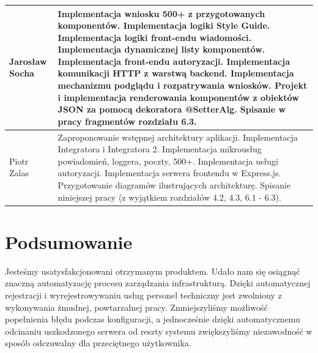 \documentclass[licencjacka]{pracamgr}
\begin{document}
\begin{tabularx}{\linewidth}{|l|X|}
	\hline
	Jarosław Socha & Implementacja wniosku 500+ z przygotowanych komponentów. \newline
		Implementacja logiki Style Guide. \newline
		Implementacja logiki front-endu wiadomości. \newline
		Implementacja dynamicznej listy komponentów. \newline
 		Implementacja front-endu autoryzacji. \newline
 		Implementacja komunikacji HTTP z warstwą backend. \newline
		Implementacja mechanizmu podglądu i rozpatrywania wniosków. \newline
		Projekt i implementacja renderowania komponentów z obiektów JSON za pomocą dekoratora @SetterAlg. \newline
		Spisanie w pracy fragmentów rozdziału 6.3.
	\\
	\hline 
	Piotr Zalas & Zaproponowanie wstępnej architektury aplikacji.\newline
	  Implementacja Integratora i Integratora 2.\newline
	  Implementacja mikrousług powiadomień, loggera, poczty, 500+.\newline
	  Implementacja usługi autoryzacji.\newline
	  Implementacja serwera frontendu w Express.js.\newline
	  Przygotowanie diagramów ilustrujących architekturę.\newline
	  Spisanie niniejszej pracy (z wyjątkiem rozdziałów 4.2, 4.3, 6.1 - 6.3).\\
	\hline
\end{tabularx}

\chapter{Podsumowanie}

Jesteśmy usatysfakcjonowani otrzymanym produktem. Udało nam się osiągnąć znaczną
automatyzację procesu zarządzania infrastrukturą. Dzięki automatycznej rejestracji i
wyrejestrowywaniu usług personel techniczny jest zwolniony z wykonywania żmudnej,
powtarzalnej pracy. Zmniejszyliśmy możliwość popełnienia błędu podczas konfiguracji,
a jednocześnie dzięki automatycznemu odcinaniu uszkodzonego serwera od reszty systemu
zwiększyliśmy niezawodność w sposób odczuwalny dla przeciętnego użytkownika.
\end{document}

